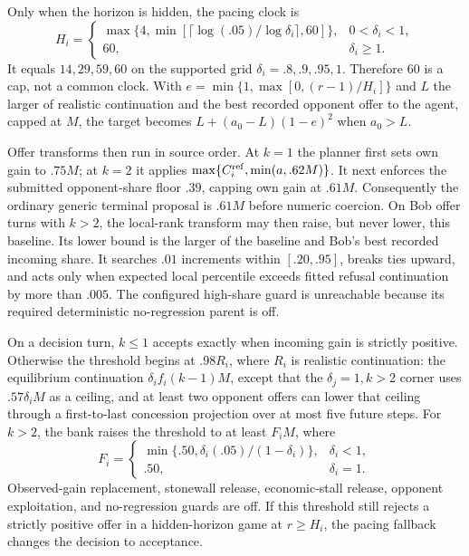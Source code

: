 Only when the horizon is hidden, the pacing clock is
\begin{equation}
H_i=\begin{cases}
\max\{4,\min[\lceil\log(.05)/\log\delta_i\rceil,60]\},
   &0<\delta_i<1,\\
60,&\delta_i\geq1.
\end{cases}
\label{eq:effective_barg_horizon}
\end{equation}
It equals $14,29,59,60$ on the supported grid
$\delta_i=.8,.9,.95,1$. Therefore $60$ is a cap, not a common clock. With
$e=\min\{1,\max[0,(r-1)/H_i]\}$ and $L$ the larger of realistic continuation
and the best recorded opponent offer to the agent, capped at $M$, the target
becomes $L+(a_0-L)(1-e)^2$ when $a_0>L$.

Offer transforms then run in source order. At $k=1$ the planner first sets own
gain to $.75M$; at $k=2$ it applies
$\max\{C_i^{\rm ref},\min(a,.62M)\}$. It next enforces the submitted
opponent-share floor $.39$, capping own gain at $.61M$. Consequently the
ordinary generic terminal proposal is $.61M$ before numeric coercion. On Bob
offer turns with $k>2$, the local-rank transform may then raise, but never
lower, this baseline. Its lower bound is the larger of the baseline and Bob's
best recorded incoming share. It searches $.01$ increments within $[.20,.95]$,
breaks ties upward, and acts only when expected local percentile exceeds fitted
refusal continuation by more than $.005$. The configured high-share guard is
unreachable because its required deterministic no-regression parent is off.

On a decision turn, $k\leq1$ accepts exactly when incoming gain is strictly
positive. Otherwise the threshold begins at $.98R_i$, where $R_i$ is realistic
continuation: the equilibrium continuation $\delta_if_i(k-1)M$, except that
the $\delta_j=1,k>2$ corner uses $.57\delta_iM$ as a ceiling, and at least two
opponent offers can lower that ceiling through a first-to-last concession
projection over at most five future steps. For $k>2$, the bank raises the
threshold to at least $F_iM$, where
\begin{equation}
F_i=\begin{cases}
\min\{.50,\delta_i(.05)/(1-\delta_i)\},&\delta_i<1,\\
.50,&\delta_i=1.
\end{cases}
\label{eq:generic_barg_accept_floor}
\end{equation}
Observed-gain replacement, stonewall release, economic-stall release,
opponent exploitation, and no-regression guards are off. If this threshold
still rejects a strictly positive offer in a hidden-horizon game at
$r\geq H_i$, the pacing fallback changes the decision to acceptance.


